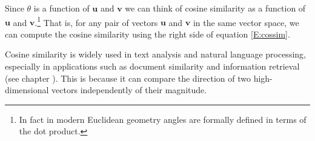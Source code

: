Since $\theta$ is a function of  $\mathbf{u}$ and  $\mathbf{v}$ 
we can think of cosine similarity as a function of  $\mathbf{u}$ and  $\mathbf{v}$.\footnote{In fact in modern Euclidean geometry 
angles are formally defined in terms of the dot product.}  
That is, for any pair of vectors $\mathbf{u}$ and  $\mathbf{v}$ in the same vector space, we can compute the cosine similarity 
using the right side of equation \eqref{E:cossim}.

   Cosine similarity is widely used in text analysis and natural language 
processing, especially in applications such as document similarity and 
information retrieval (see chapter ). This is 
because it can compare the direction of two high-dimensional vectors independently
of their magnitude. 

